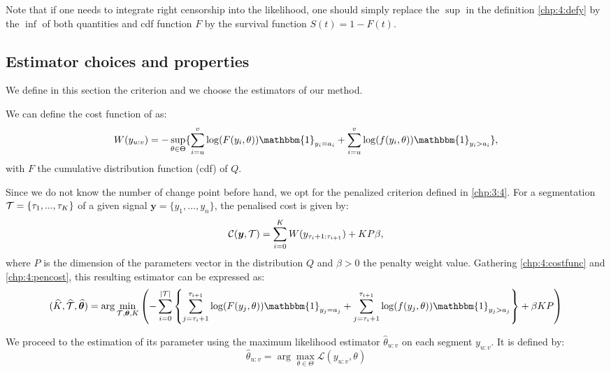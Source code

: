 Note that if one needs to integrate right censorship into the likelihood, one should simply replace the $\sup$ in the definition \ref{chp:4:defy} by the $\inf$ of both quantities and cdf function $F$ by the survival function $S(t)=1-F(t)$. 


\subsection{Estimator choices and properties}

We define in this section the criterion and we choose the estimators of our method. 

We can define the cost function of  as:    
\begin{equation}\label{chp:4:costfunc}
W(y_{u:v}) = -\sup_{\theta\in\Theta}\{\sum_{i=u}^v\log(F(y_i,\theta))\mathbbm{1}_{y_i=a_i}+\sum_{i=u}^v\log(f(y_i,\theta))\mathbbm{1}_{y_i>a_i}\},
\end{equation}
with $F$ the cumulative distribution function (cdf) of $Q$.

Since we do not know the number of change point before hand, we opt for the penalized criterion defined in \ref{chp:3:4}. For a segmentation ${\mathcal T} = \{\tau_1,...,\tau_K\}$ of a given signal $\bm y =\{y_1,\dots,y_n\}$, the penalised cost is given by: 
\begin{equation}\label{chp:4:pencost}
{\mathcal C}(\bm y,{\mathcal T})=\sum_{i=0}^{K}  W(y_{\tau_i+1:\tau_{i+1}}) + KP\beta,
\end{equation}
where $P$ is the dimension of the parameters vector in the distribution $Q$ and $\beta > 0$ the penalty weight value. Gathering \ref{chp:4:costfunc} and \ref{chp:4:pencost}, this resulting estimator can be expressed as:  
\begin{equation}\label{chp:4:estim}
(\widehat{K},\widehat{\TT},\widehat{\bm \theta}) = \arg\min_{\TT,\bm \theta,K} \left(- \sum_{i=0}^{\lvert \TT \rvert}  \left\{\sum_{j=\tau_i+1}^{\tau_{i+1}}\log(F(y_j,\theta))\mathbbm{1}_{y_j=a_j}+\sum_{j=\tau_i+1}^{\tau_{i+1}}\log(f(y_j,\theta))\mathbbm{1}_{y_j>a_j}\right\}+\beta KP\right)
\end{equation}

We proceed to the estimation of its parameter using the maximum likelihood estimator $\widehat{\theta}_{u:v}$ on each segment $y_{u:v}$. It is defined by:
\begin{equation}\label{chp:4:emv}
\widehat{\theta}_{u:v} = \arg\max_{\theta \in \Theta}\mathcal{L}(y_{u:v},\theta)
\end{equation}

